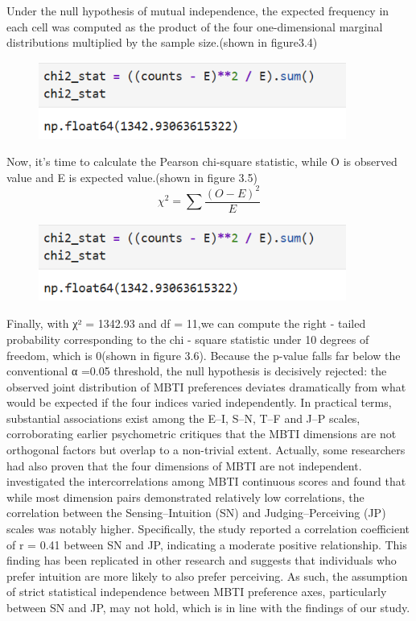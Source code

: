 \documentclass[12pt]{article}
\begin{document}
	Under the null hypothesis of mutual independence, the expected frequency in each cell was computed as the product of the four one-dimensional marginal distributions multiplied by the sample size.(shown in figure3.4)
	\begin{figure}[H]
		\centering
		\includegraphics[width=0.9\textwidth]{Q1P10}
		
	\end{figure}
	Now, it’s time to calculate the Pearson chi-square statistic, while O is observed value and E is expected value.(shown in figure 3.5)
	\[
	\chi^2 = \sum \frac{(O - E)^2}{E}
	\]
	\begin{figure}[H]
		\centering
		\includegraphics[width=0.9\textwidth]{Q1P10}
		
	\end{figure}
	Finally, with χ² = 1342.93 and df = 11,we can compute the right - tailed probability corresponding to the chi - square statistic under 10 degrees of freedom, which is 0(shown in figure 3.6). Because the p-value falls far below the conventional α =0.05 threshold, the null hypothesis is decisively rejected: the observed joint distribution of MBTI preferences deviates dramatically from what would be expected if the four indices varied independently. In practical terms, substantial associations exist among the E–I, S–N, T–F and J–P scales, corroborating earlier psychometric critiques that the MBTI dimensions are not orthogonal factors but overlap to a non-trivial extent. Actually, some researchers had also proven that the four dimensions of MBTI are not independent.  investigated the intercorrelations among MBTI continuous scores and found that while most dimension pairs demonstrated relatively low correlations, the correlation between the Sensing–Intuition (SN) and Judging–Perceiving (JP) scales was notably higher. Specifically, the study reported a correlation coefficient of r = 0.41 between SN and JP, indicating a moderate positive relationship. This finding has been replicated in other research and suggests that individuals who prefer intuition are more likely to also prefer perceiving. As such, the assumption of strict statistical independence between MBTI preference axes, particularly between SN and JP, may not hold, which is in line with the findings of our study.
\end{document}
